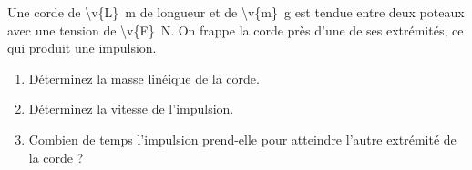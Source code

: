 Une corde de \qty{\v{L}}{m} de longueur et de \qty{\v{m}}{g} est tendue entre deux poteaux avec une tension de \qty{\v{F}}{N}. On frappe la corde près d'une de ses extrémités, ce qui produit une impulsion.

\begin{enumerate}[label=\alph*)]
    \item Déterminez la masse linéique de la corde.
    \item Déterminez la vitesse de l'impulsion.
    \item Combien de temps l'impulsion prend-elle pour atteindre l'autre extrémité de la corde ?
\end{enumerate}

